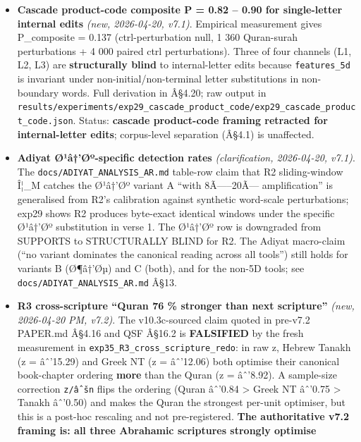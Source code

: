\documentclass[
]{article}
\begin{document}
\begin{itemize}
{  retracted}; the reported scalar stands unchanged. Surfaced by
  \texttt{exp28\_scale\_invariant\_law}. The exp28 verdict is unaffected
  --- it reports the observed direction, not the docstring direction.
\item
  \textbf{Cascade product-code composite P = 0.82 -- 0.90 for
  single-letter internal edits} \emph{(new, 2026-04-20, v7.1)}.
  Empirical measurement gives P\_composite = 0.137 (ctrl-perturbation
  null, 1 360 Quran-surah perturbations + 4 000 paired ctrl
  perturbations). Three of four channels (L1, L2, L3) are
  \textbf{structurally blind} to internal-letter edits because
  \texttt{features\_5d} is invariant under non-initial/non-terminal
  letter substitutions in non-boundary words. Full derivation in Â§4.20;
  raw output in
  \texttt{results/experiments/exp29\_cascade\_product\_code/exp29\_cascade\_product\_code.json}.
  Status: \textbf{cascade product-code framing retracted for
  internal-letter edits}; corpus-level separation (Â§4.1) is unaffected.
\item
  \textbf{Adiyat Ø¹â†'Øº-specific detection rates} \emph{(clarification,
  2026-04-20, v7.1)}. The \texttt{docs/ADIYAT\_ANALYSIS\_AR.md}
  table-row claim that R2 sliding-window Î¦\_M catches the Ø¹â†'Øº
  variant A ``with 8Ã-----20Ã--- amplification'' is generalised from
  R2's calibration against synthetic word-scale perturbations; exp29
  shows R2 produces byte-exact identical windows under the specific
  Ø¹â†'Øº substitution in verse 1. The Ø¹â†'Øº row is downgraded from
  SUPPORTS to STRUCTURALLY BLIND for R2. The Adiyat macro-claim (``no
  variant dominates the canonical reading across all tools'') still
  holds for variants B (Ø¶â†'Øµ) and C (both), and for the non-5D tools;
  see \texttt{docs/ADIYAT\_ANALYSIS\_AR.md} Â§13.
\item
  \textbf{R3 cross-scripture ``Quran 76 \% stronger than next
  scripture''} \emph{(new, 2026-04-20 PM, v7.2)}. The v10.3c-sourced
  claim quoted in pre-v7.2 PAPER.md Â§4.16 and QSF Â§16.2 is
  \textbf{FALSIFIED} by the fresh measurement in
  \texttt{exp35\_R3\_cross\_scripture\_redo}: in raw z, Hebrew Tanakh (z
  = âˆ'15.29) and Greek NT (z = âˆ'12.06) both optimise their canonical
  book-chapter ordering \textbf{more} than the Quran (z = âˆ'8.92). A
  sample-size correction \texttt{z/âˆšn} flips the ordering (Quran
  âˆ'0.84 \textgreater{} Greek NT âˆ'0.75 \textgreater{} Tanakh âˆ'0.50)
  and makes the Quran the strongest per-unit optimiser, but this is a
  post-hoc rescaling and not pre-registered. \textbf{The authoritative
  v7.2 framing is: all three Abrahamic scriptures strongly optimise
}
\end{itemize}
\end{document}
